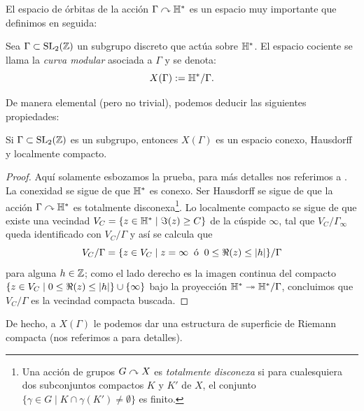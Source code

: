 El espacio de \'orbitas de la acci\'on $\Gamma\curvearrowright\mathbb{H}^*$ es un espacio muy importante que definimos
en seguida:

\begin{defin}\label{def:curva_modular}
  Sea $\Gamma\subset\mathrm{SL}_2(\mathbb{Z})$ un subgrupo discreto que act\'ua sobre $\mathbb{H}^*$. El espacio cociente
  se llama la \emph{curva modular} asociada a $\Gamma$ y se denota:
  \[
    X(\Gamma):=\mathbb{H}^*/\Gamma.
  \]
\end{defin}

De manera elemental (pero no trivial), podemos deducir las siguientes propiedades:

\begin{prop}\label{prop:de_curva_modular}
  Si $\Gamma\subset\mathrm{SL}_2(\mathbb{Z})$ es un subgrupo, entonces $X(\Gamma)$ es un espacio
  conexo, Hausdorff y localmente compacto.
\end{prop}

\begin{proof}
  Aqu\'i solamente esbozamos la prueba, para m\'as detalles nos referimos a
  \cite[\S1.3, teorema 1.28 y proposici\'on 1.29 respectivamente]{ShimuraITTATOAF}. La conexidad
  se sigue de que $\mathbb{H}^*$ es conexo. Ser Hausdorff se sigue de que la acci\'on $\Gamma\curvearrowright\mathbb{H}^*$
  es totalmente disconexa\footnote{Una acci\'on de grupos $G\curvearrowright X$ es \emph{totalmente disconexa}
    si para cualesquiera dos subconjuntos compactos $K$ y $K'$ de $X$, el conjunto
    $\{\gamma\in G\mid K\cap \gamma(K')\neq\emptyset\}$ es finito.}.
  Lo localmente compacto se sigue de que existe una vecindad $V_C=\{z\in\mathbb{H}^*\mid\Im(z)\geq C\}$ de
  la c\'uspide $\infty$, tal que $V_C/\Gamma_{\infty}$ queda identificado con $V_C/\Gamma$ y as\'i
  se calcula que
  \[
    V_C/\Gamma=\{z\in V_C\mid z=\infty \;\;\text{\'o}\;\;0\leq\Re(z)\leq\left| h \right|\}/\Gamma
  \]
  para alguna $h\in\mathbb{Z}$; como el lado derecho es la imagen continua del compacto
  $\{z\in V_C\mid 0\leq\Re(z)\leq\left| h \right|\}\cup\{\infty\}$ bajo la proyecci\'on
  $\mathbb{H}^*\twoheadrightarrow\mathbb{H}^*/\Gamma$, concluimos que $V_C/\Gamma$ es la vecindad compacta buscada.
\end{proof}

De hecho, a $X(\Gamma)$ le podemos dar una estructura de superficie
de Riemann compacta (nos referimos a \cite[\S2.2, \S2.3, \S2.4]{DiamondShurmanAFCIMF}
para detalles).



